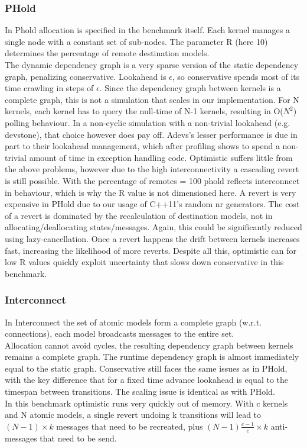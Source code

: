 \subsubsection{PHold}
In Phold allocation is specified in the benchmark itself. Each kernel manages a single node with a constant set of sub-nodes. The parameter R (here 10) determines the percentage of remote destination models.\\
The dynamic dependency graph is a very sparse version of the static dependency graph, penalizing conservative. Lookahead is $\epsilon$, so conservative spends most of its time crawling in steps of $\epsilon$. Since the dependency graph between kernels is a complete graph, this is not a simulation that scales in our implementation. For N kernels, each kernel has to query the null-time of N-1 kernels, resulting in O($N^2$) polling behaviour. In a non-cyclic simulation with a non-trivial lookahead (e.g. devstone), that choice however does pay off. Adevs's lesser performance is due in part to their lookahead management, which after profiling shows to spend a non-trivial amount of time in exception handling code. 
Optimistic suffers little from the above problems, however due to the high interconnectivity a cascading revert is still possible. With the percentage of remotes = 100 phold reflects interconnect in behaviour, which is why the R value is not dimensioned here. A revert is very expensive in PHold due to our usage of C++11's random nr generators. The cost of a revert is dominated by the recalculation of destination models, not in allocating/deallocating states/messages. Again, this could be significantly reduced using lazy-cancellation. Once a revert happens the drift between kernels increases fast, increasing the likelihood of more reverts. Despite all this, optimistic can for low R values quickly exploit uncertainty that slows down conservative in this benchmark.

\subsubsection{Interconnect}
In Interconnect
the set of atomic models form a complete graph (w.r.t. connections), each model broadcasts messages to the entire set. \\
Allocation cannot avoid cycles, the resulting dependency graph between kernels remains a complete graph. The runtime dependency graph is almost immediately equal to the static graph.
Conservative still faces the same issues as in PHold, with the key difference that for a fixed time advance lookahead is equal to the timespan between transitions. The scaling issue is identical as with PHold.\\
In this benchmark optimistic runs very quickly out of memory. With c kernels and N atomic models, a single revert undoing k transitions will lead to $(N-1)\times k$ messages that need to be recreated, plus $(N-1) \frac{c-1}{c} \times k$ anti-messages that need to be send.

